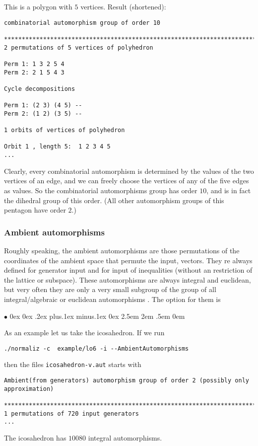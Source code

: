 \documentclass[12pt,a4paper]{scrartcl}
\newcommand{\stdli}{ \topsep0ex \partopsep0ex %
\parsep.2ex plus.1ex minus.1ex \itemsep0ex%
\leftmargin2.5em \labelwidth2em \labelsep.5em \rightmargin0em}%
\renewenvironment{itemize}{\begin{list}{{$\bullet$}}{\stdli}}{\end{list}}
\theoremstyle{definition}
\def\itemtt[#1]{\item[\textbf{\ttt{#1}}]}
\def\ttt{\texttt}
\begin{document}
This is a polygon with $5$ vertices. Result (shortened):
\begin{Verbatim}
combinatorial automorphism group of order 10

************************************************************************
2 permutations of 5 vertices of polyhedron

Perm 1: 1 3 2 5 4
Perm 2: 2 1 5 4 3

Cycle decompositions 

Perm 1: (2 3) (4 5) --
Perm 2: (1 2) (3 5) --

1 orbits of vertices of polyhedron

Orbit 1 , length 5:  1 2 3 4 5
...
\end{Verbatim}


Clearly, every combinatorial automorphism is determined by the values of the two vertices of an edge, and we can freely choose the vertices of any of the five edges as values. So the combinatorial automorphisms group has order $10$, and is in fact the dihedral group of this order. (All other automorphism groups of this pentagon have order $2$.)

\subsubsection{Ambient automorphisms}

Roughly speaking, the ambient automorphisms are those permutations of the coordinates of the ambient space that permute the input, vectors. They re always defined for generator input and for input of inequalities (without an restriction of the lattice or subspace). These automorphisms are always integral and euclidean, but very often they are only a very small subgroup of the group of all integral/algebraic or euclidean automorphisms . The option for them is
\begin{itemize}
	\itemtt[AmbientAutomorphisms]
\end{itemize}
As an example let us take the icosahedron. If we run
\begin{Verbatim}
./normaliz -c  example/lo6 -i --AmbientAutomorphisms
\end{Verbatim}
then the files \verb|icosahedron-v.aut| starts with 
\begin{Verbatim}
Ambient(from generators) automorphism group of order 2 (possibly only approximation)

************************************************************************
1 permutations of 720 input generators
...
\end{Verbatim}
The icosahedron has $10080$ integral automorphisms.
\end{document}
